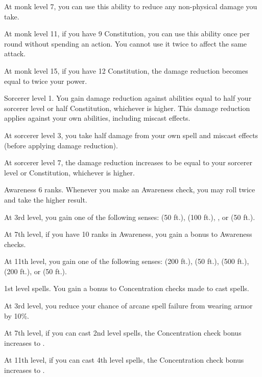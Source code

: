     At monk level 7, you can use this ability to reduce any non-physical damage you take.

    At monk level 11, if you have 9 Constitution, you can use this ability once per round without spending an action.
    You cannot use it twice to affect the same attack.

    At monk level 15, if you have 12 Constitution, the damage reduction becomes equal to twice your \ki power.

    \featpre Sorcerer level 1.
    \featben You gain damage reduction against  abilities equal to half your sorcerer level or half Constitution, whichever is higher.
    This damage reduction applies against your own abilities, including miscast effects.

    At sorcerer level 3, you take half damage from your own spell and miscast effects (before applying damage reduction).

    At sorcerer level 7, the damage reduction increases to be equal to your sorcerer level or Constitution, whichever is higher.


    \featpre Awareness 6 ranks.
    \featben Whenever you make an Awareness check, you may roll twice and take the higher result.

    At 3rd level, you gain one of the following senses:  (50 ft.),  (100 ft.), , or  (50 ft.).

    At 7th level, if you have 10 ranks in Awareness, you gain a  bonus to Awareness checks.

    At 11th level, you gain one of the following senses:  (200 ft.),  (50 ft.),  (500 ft.),  (200 ft.), or  (50 ft.).

    \featpre 1st level spells.
    \featben You gain a  bonus to Concentration checks made to cast spells.

    At 3rd level, you reduce your chance of arcane spell failure from wearing armor by 10\%.

    At 7th level, if you can cast 2nd level spells, the Concentration check bonus increases to .

    At 11th level, if you can cast 4th level spells, the Concentration check bonus increases to .

